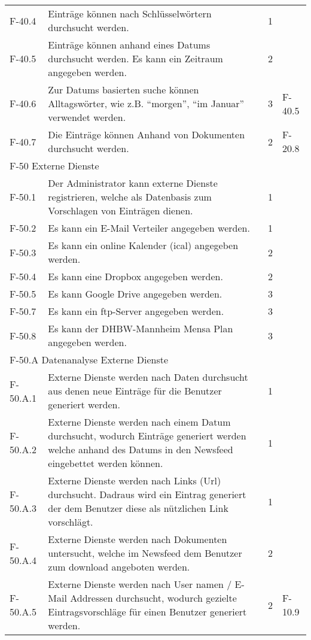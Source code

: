 \begin{tabularx}{\textwidth}{|l|X|l|l|}
    F-40.4 & Einträge können nach Schlüsselwörtern durchsucht werden. & 1 & \\
    F-40.5 & Einträge können anhand eines Datums durchsucht werden. Es kann ein Zeitraum angegeben werden. & 2 & \\
    F-40.6 & Zur Datums basierten suche können Alltagswörter, wie z.B. \enquote{morgen}, \enquote{im Januar} verwendet werden. & 3 & F-40.5\\
    F-40.7 & Die Einträge können Anhand von Dokumenten durchsucht werden. & 2 & F-20.8\\
    \hline
    \multicolumn{4}{|l|}{F-50 Externe Dienste}\\
    \hline
    F-50.1 & Der Administrator kann externe Dienste registrieren, welche als Datenbasis zum Vorschlagen von Einträgen dienen. & 1 & \\
    F-50.2 & Es kann ein E-Mail Verteiler angegeben werden. & 1 & \\
    F-50.3 & Es kann ein online Kalender (ical) angegeben werden. & 2 & \\
    F-50.4 & Es kann eine Dropbox angegeben werden. & 2 & \\
    F-50.5 & Es kann Google Drive angegeben werden. & 3 & \\
    F-50.7 & Es kann ein ftp-Server angegeben werden. & 3 & \\
    F-50.8 & Es kann der DHBW-Mannheim Mensa Plan angegeben werden. & 3 & \\
    \hline
    \multicolumn{4}{|l|}{F-50.A Datenanalyse Externe Dienste}\\
    \hline
    F-50.A.1 & Externe Dienste werden nach Daten durchsucht aus denen neue Einträge für die Benutzer generiert werden. & 1 & \\
    F-50.A.2 & Externe Dienste werden nach einem Datum durchsucht, wodurch Einträge generiert werden welche anhand des Datums in den Newsfeed eingebettet werden können. & 1 & \\
    F-50.A.3 & Externe Dienste werden nach Links (Url) durchsucht. Dadraus wird ein Eintrag generiert der dem Benutzer diese als nützlichen Link vorschlägt. & 1 & \\
    F-50.A.4 & Externe Dienste werden nach Dokumenten untersucht, welche im Newsfeed dem Benutzer zum download angeboten werden. & 2 & \\
    F-50.A.5 & Externe Dienste werden nach User namen / E-Mail Addressen durchsucht, wodurch gezielte Eintragsvorschläge für einen Benutzer generiert werden. & 2 & F-10.9 \\

\end{tabularx}
